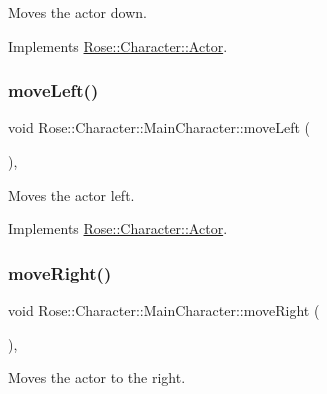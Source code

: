 Moves the actor down. 



Implements \mbox{\hyperlink{classRose_1_1Character_1_1Actor_a3ccb744404ed29c77fe9420f274a6826}{Rose\+::\+Character\+::\+Actor}}.

\mbox{\label{classRose_1_1Character_1_1MainCharacter_a80dd452d836ec63345c0afbfff664a7e}} 
\subsubsection{\texorpdfstring{moveLeft()}{moveLeft()}}
{\footnotesize\ttfamily void Rose\+::\+Character\+::\+Main\+Character\+::move\+Left (\begin{DoxyParamCaption}{ }\end{DoxyParamCaption})\hspace{0.3cm}{\ttfamily [override]}, {\ttfamily [virtual]}}



Moves the actor left. 



Implements \mbox{\hyperlink{classRose_1_1Character_1_1Actor_a45191259db61cf46cb3d99bf186b48d3}{Rose\+::\+Character\+::\+Actor}}.

\mbox{\label{classRose_1_1Character_1_1MainCharacter_a08b5eae4f7ccabe74d1764993b0dcf91}} 
\subsubsection{\texorpdfstring{moveRight()}{moveRight()}}
{\footnotesize\ttfamily void Rose\+::\+Character\+::\+Main\+Character\+::move\+Right (\begin{DoxyParamCaption}{ }\end{DoxyParamCaption})\hspace{0.3cm}{\ttfamily [override]}, {\ttfamily [virtual]}}



Moves the actor to the right. 



